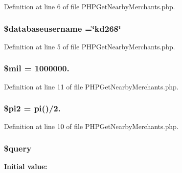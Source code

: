 Definition at line 6 of file P\-H\-P\-Get\-Nearby\-Merchants.\-php.

\hypertarget{_p_h_p_get_nearby_merchants_8php_a251bf75f510d7c8b556c65d7c30e911f}{
\subsubsection[{\$databaseusername}]{\setlength{\rightskip}{0pt plus 5cm}\$databaseusername =\char`\"{}kd268\char`\"{}}}\label{_p_h_p_get_nearby_merchants_8php_a251bf75f510d7c8b556c65d7c30e911f}


Definition at line 5 of file P\-H\-P\-Get\-Nearby\-Merchants.\-php.

\hypertarget{_p_h_p_get_nearby_merchants_8php_a6bb435d1aeba7b0eb488140d4913b17f}{
\subsubsection[{\$mil}]{\setlength{\rightskip}{0pt plus 5cm}\$mil = 1000000.}}\label{_p_h_p_get_nearby_merchants_8php_a6bb435d1aeba7b0eb488140d4913b17f}


Definition at line 11 of file P\-H\-P\-Get\-Nearby\-Merchants.\-php.

\hypertarget{_p_h_p_get_nearby_merchants_8php_af469a8b11a566ce9fbd4e856f3cd8282}{
\subsubsection[{\$pi2}]{\setlength{\rightskip}{0pt plus 5cm}\$pi2 = pi()/2.}}\label{_p_h_p_get_nearby_merchants_8php_af469a8b11a566ce9fbd4e856f3cd8282}


Definition at line 10 of file P\-H\-P\-Get\-Nearby\-Merchants.\-php.

\hypertarget{_p_h_p_get_nearby_merchants_8php_af59a5f7cd609e592c41dc3643efd3c98}{
\subsubsection[{\$query}]{\setlength{\rightskip}{0pt plus 5cm}\$query}}\label{_p_h_p_get_nearby_merchants_8php_af59a5f7cd609e592c41dc3643efd3c98}
{\bfseries Initial value\-:}


